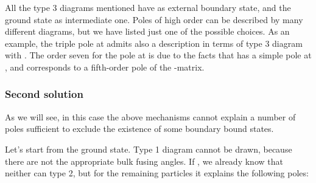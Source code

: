 \documentclass[a4paper,12pt]{report}
\begin{document}
\vspace{0.5cm}

All the type 3 diagrams mentioned have \myHighlight{$\alpha$}\coordHE{} as external boundary state, and the ground state as intermediate
one. Poles of high order can be described by many different diagrams, but we have listed just one of the possible
choices. As an example, the  triple pole at \coordHE{} admits also a description in terms of
type 3 diagram with \coordHE{}. The order seven for the pole at \coordHE{} is due to the facts
that \coordHE{} has a simple pole at \coordHE{}, and \coordHE{} corresponds to a fifth-order
pole of the \coordHE{}-matrix.


\subsubsection{Second solution}

As we will see, in this case the above mechanisms cannot explain a number of poles sufficient to exclude the
existence of some boundary bound states.

Let's start from the ground state. Type 1 diagram cannot be drawn, because there are not the appropriate bulk
fusing angles. If \coordHE{}, we already know that neither can type 2, but for the remaining particles it explains
the following poles:
\end{document}
